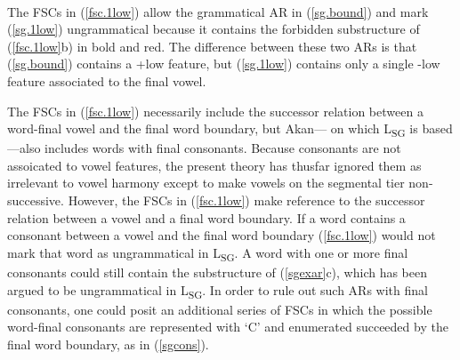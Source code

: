 \documentclass[,doc,floatsintext]{apa6}
\theoremstyle{definition}
\theoremstyle{definition}
\theoremstyle{definition}
\theoremstyle{remark}
\begin{document}
\begin{exe}
 \label{sg.1low} \\
\end{exe}

\noindent The FSCs in (\ref{fsc.1low}) allow the grammatical AR in
(\ref{sg.bound}) and mark (\ref{sg.1low}) ungrammatical because it
contains the forbidden substructure of (\ref{fsc.1low}b) in bold and
red. The difference between these two ARs is that (\ref{sg.bound})
contains a +low feature, but (\ref{sg.1low}) contains only a single -low
feature associated to the final vowel.

The FSCs in (\ref{fsc.1low}) necessarily include the successor relation
between a word-final vowel and the final word boundary, but Akan--- on
which L\textsubscript{SG} is based ---also includes words with final
consonants. Because consonants are not assoicated to vowel features, the
present theory has thusfar ignored them as irrelevant to vowel harmony
except to make vowels on the segmental tier non-successive. However, the
FSCs in (\ref{fsc.1low}) make reference to the successor relation
between a vowel and a final word boundary. If a word contains a
consonant between a vowel and the final word boundary (\ref{fsc.1low})
would not mark that word as ungrammatical in L\textsubscript{SG}. A word
with one or more final consonants could still contain the substructure
of (\ref{sgexar}c), which has been argued to be ungrammatical in
L\textsubscript{SG}. In order to rule out such ARs with final
consonants, one could posit an additional series of FSCs in which the
possible word-final consonants are represented with `C' and enumerated
succeeded by the final word boundary, as in (\ref{sgcons}).
\end{document}
